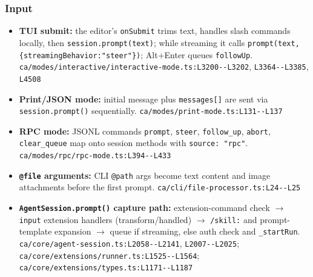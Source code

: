 \subsubsection*{Input}
\begin{itemize}
\item \textbf{TUI submit:} the editor's \texttt{onSubmit} trims text, handles slash commands locally, then \texttt{session.\allowbreak{}prompt(\allowbreak{}text)}; while streaming it calls \texttt{prompt(\allowbreak{}text, \{streamingBehavior:\allowbreak{}"steer"\})}; Alt+Enter queues \texttt{followUp}. \texttt{ca/\allowbreak{}modes/\allowbreak{}interactive/\allowbreak{}interactive-\allowbreak{}mode.\allowbreak{}ts:\allowbreak{}L3200-\allowbreak{}-\allowbreak{}L3202}, \texttt{L3364-\allowbreak{}-\allowbreak{}L3385}, \texttt{L4508}
\item \textbf{Print/JSON mode:} initial message plus \texttt{messages[]} are sent via \texttt{session.\allowbreak{}prompt(\allowbreak{})} sequentially. \texttt{ca/\allowbreak{}modes/\allowbreak{}print-\allowbreak{}mode.\allowbreak{}ts:\allowbreak{}L131-\allowbreak{}-\allowbreak{}L137}
\item \textbf{RPC mode:} JSONL commands \texttt{prompt}, \texttt{steer}, \texttt{follow\_\allowbreak{}up}, \texttt{abort}, \texttt{clear\_\allowbreak{}queue} map onto session methods with \texttt{source:\allowbreak{} "rpc"}. \texttt{ca/\allowbreak{}modes/\allowbreak{}rpc/\allowbreak{}rpc-\allowbreak{}mode.\allowbreak{}ts:\allowbreak{}L394-\allowbreak{}-\allowbreak{}L433}
\item \textbf{\texttt{@file} arguments:} CLI \texttt{@path} args become text content and image attachments before the first prompt. \texttt{ca/\allowbreak{}cli/\allowbreak{}file-\allowbreak{}processor.\allowbreak{}ts:\allowbreak{}L24-\allowbreak{}-\allowbreak{}L25}
\item \textbf{\texttt{AgentSession.\allowbreak{}prompt(\allowbreak{})} capture path:} extension-command check $\rightarrow$ \texttt{input} extension handlers (transform/handled) $\rightarrow$ \texttt{/\allowbreak{}skill:\allowbreak{}} and prompt-template expansion $\rightarrow$ queue if streaming, else auth check and \texttt{\_\allowbreak{}startRun}. \texttt{ca/\allowbreak{}core/\allowbreak{}agent-\allowbreak{}session.\allowbreak{}ts:\allowbreak{}L2058-\allowbreak{}-\allowbreak{}L2141}, \texttt{L2007-\allowbreak{}-\allowbreak{}L2025}; \texttt{ca/\allowbreak{}core/\allowbreak{}extensions/\allowbreak{}runner.\allowbreak{}ts:\allowbreak{}L1525-\allowbreak{}-\allowbreak{}L1564}; \texttt{ca/\allowbreak{}core/\allowbreak{}extensions/\allowbreak{}types.\allowbreak{}ts:\allowbreak{}L1171-\allowbreak{}-\allowbreak{}L1187}

\end{itemize}
